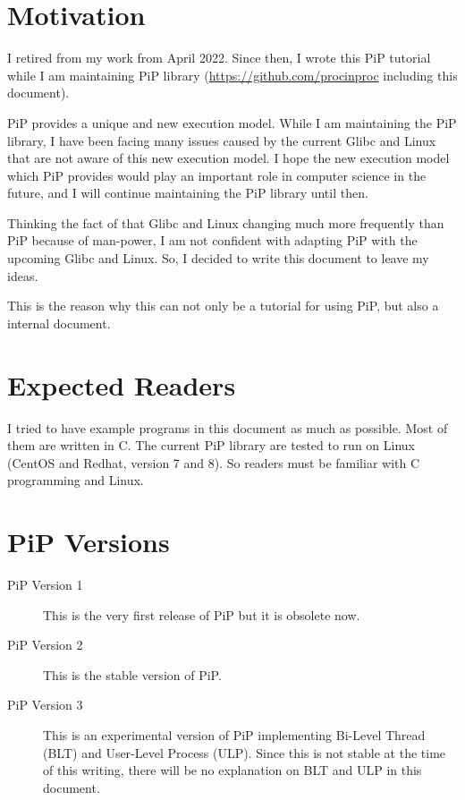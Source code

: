 
\section*{Motivation}

I retired from my work from April 2022. Since then, I wrote this PiP
tutorial while I am maintaining PiP library
(\url{https://github.com/procinproc} including this document).

PiP provides a unique and new execution model. While I am maintaining
the PiP library, I have been facing many issues caused by the current
Glibc and Linux that are not aware of this new execution model. 
I hope the new execution model which PiP provides would play an
important role in computer science in the future, and I will continue
maintaining the PiP library until then.

Thinking the fact of that Glibc and Linux changing much more
frequently than PiP because of man-power, I am not confident with
adapting PiP with the upcoming Glibc and Linux. So, I decided to write
this document to leave my ideas.

This is the reason why this can not only be a tutorial for
using PiP, but also a internal document. 

\section*{Expected Readers}

I tried to have example programs in this document as much as
possible. Most of them are written in C. The current PiP library are
tested to run on Linux (CentOS and Redhat, version 7 and 8). So
readers must be familiar with C programming and Linux.

\section*{PiP Versions}

\begin{description}
\item[PiP Version 1]
  This is the very first release of PiP but it is obsolete now.
\item[PiP Version 2]
  This is the stable version of PiP.
\item[PiP Version 3]
  This is an experimental version of PiP implementing Bi-Level Thread
  (BLT) and User-Level Process (ULP). Since this is not stable at the
  time of this writing, there will be no explanation on BLT and ULP in
  this document.
\end{description}

